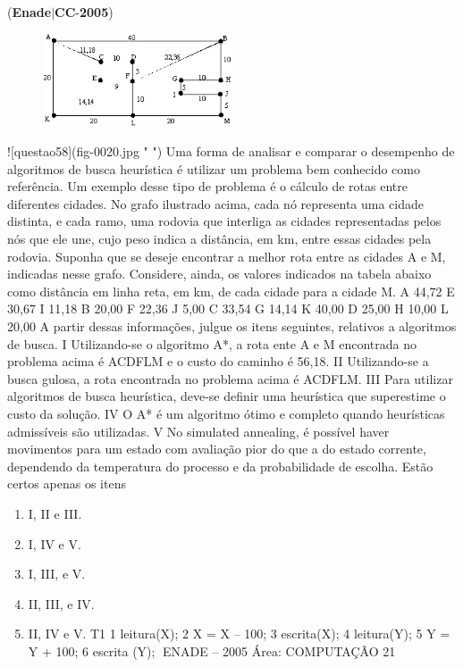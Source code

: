 \documentclass{exam}
\begin{document}
\begin{questions}
\begin{enumerate}[label=\alph*)]
	\end{enumerate}

\question (\textbf{Enade}$|$\textbf{CC}-\textbf{2005}) \begin{figure}[H]
	\begin{center}
		\includegraphics[width=0.5\textwidth]{CIENCIA_DA_COMPUTACAO_Prova2005-utf8_figuras/fig-0020.jpg}
		\caption{ }
	\end{center}
\end{figure}
![questao58](fig-0020.jpg " ")
Uma forma de analisar e comparar o desempenho de algoritmos
de busca heurística é utilizar um problema bem conhecido como
referência. Um exemplo desse tipo de problema é o cálculo de
rotas entre diferentes cidades. No grafo ilustrado acima, cada nó
representa uma cidade distinta, e cada ramo, uma rodovia que
interliga as cidades representadas pelos nós que ele une, cujo peso
indica a distância, em km, entre essas cidades pela rodovia.
Suponha que se deseje encontrar a melhor rota entre as cidades A
e M, indicadas nesse grafo. Considere, ainda, os valores indicados
na tabela abaixo como distância em linha reta, em km, de cada
cidade para a cidade M.
A 44,72 E 30,67 I 11,18
B 20,00 F 22,36 J 5,00
C 33,54 G 14,14 K 40,00
D 25,00 H 10,00 L 20,00
A partir dessas informações, julgue os itens seguintes, relativos a
algoritmos de busca.
I Utilizando-se o algoritmo A*, a rota ente A e M encontrada no
problema acima é ACDFLM e o custo do caminho é 56,18.
II Utilizando-se a busca gulosa, a rota encontrada no problema
acima é ACDFLM.
III Para utilizar algoritmos de busca heurística, deve-se definir
uma heurística que superestime o custo da solução.
IV O A* é um algoritmo ótimo e completo quando heurísticas
admissíveis são utilizadas.
V No simulated annealing, é possível haver movimentos para um
estado com avaliação pior do que a do estado corrente,
dependendo da temperatura do processo e da probabilidade
de escolha.
Estão certos apenas os itens
	\begin{enumerate}[label=\alph*)]
		\item  I, II e III.
		\item  I, IV e V.
		\item  I, III, e V.
		\item  II, III, e IV.
		\item  II, IV e V.
T1
1 leitura(X);
2 X = X – 100;
3 escrita(X);
4 leitura(Y);
5 Y = Y + 100;
6 escrita (Y);
ENADE – 2005 Área: COMPUTAÇÃO 21


\end{enumerate}
\end{questions}
\end{document}
